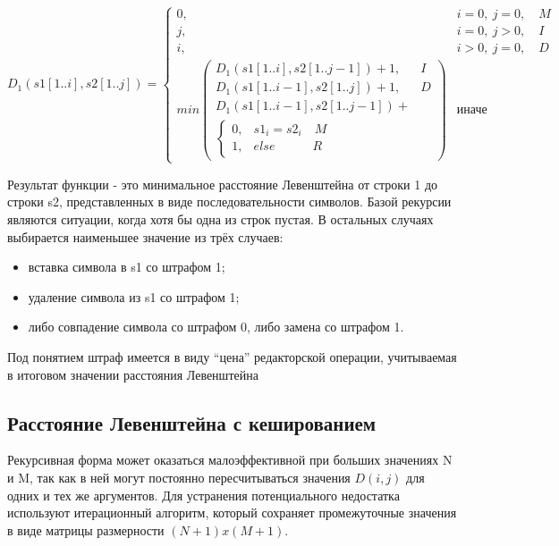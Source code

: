 \begin{equation}
D_1(s1[1..i], s2[1..j]) = 
\begin{cases}
    0, & i=0,\ j=0, \quad M \\
    
    j, & i=0,\ j>0, \quad I \\
    
    i, & i>0,\ j=0, \quad D \\
    
    min\begin{pmatrix}
        D_1(s1[1..i], s2[1..j-1]) + 1, & I \\
        
        D_1(s1[1..i-1], s2[1..j]) + 1, & D \\
        
        D_1(s1[1..i-1], s2[1..j-1]) + \\ %
        
        \begin{cases}
            0, & s1_i = s2_i \quad M \\
            
            1, & else \quad\qquad R
        \end{cases}
    \end{pmatrix} & \text{иначе}
\end{cases}
\label{eq:rec}
\end{equation}

Результат функции - это минимальное расстояние Левенштейна от строки 1 до строки s2, представленных в виде последовательности символов. Базой рекурсии являются ситуации, когда хотя бы одна из строк пустая. В остальных случаях выбирается наименьшее значение из трёх случаев:
\begin{itemize}
    \item вставка символа в s1 со штрафом 1;
    \item удаление символа из s1 со штрафом 1;
    \item либо совпадение символа со штрафом 0, либо замена со штрафом 1.
\end{itemize}

Под понятием штраф имеется в виду ``цена'' редакторской операции, учитываемая в итоговом значении расстояния Левенштейна

\subsection{Расстояние Левенштейна с кешированием}
Рекурсивная форма может оказаться малоэффективной при больших значениях N и M, так как в ней могут постоянно пересчитываться значения $D(i, j)$ для одних и тех же аргументов. Для устранения потенциального недостатка используют итерационный алгоритм, который сохраняет промежуточные значения в виде матрицы размерности $(N+1)x(M+1)$.

